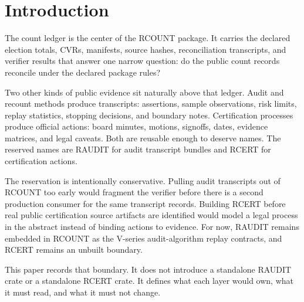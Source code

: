 \section{Introduction}

The count ledger is the center of the RCOUNT package. It carries the declared
election totals, CVRs, manifests, source hashes, reconciliation transcripts, and
verifier results that answer one narrow question: do the public count records
reconcile under the declared package rules?

Two other kinds of public evidence sit naturally above that ledger. Audit and
recount methods produce transcripts: assertions, sample observations, risk
limits, replay statistics, stopping decisions, and boundary notes. Certification
processes produce official actions: board minutes, motions, signoffs, dates,
evidence matrices, and legal caveats. Both are reusable enough to deserve names.
The reserved names are RAUDIT for audit transcript bundles and RCERT for
certification actions.

The reservation is intentionally conservative. Pulling audit transcripts out of
RCOUNT too early would fragment the verifier before there is a second production
consumer for the same transcript records. Building RCERT before real public
certification source artifacts are identified would model a legal process in the
abstract instead of binding actions to evidence. For now, RAUDIT remains embedded
in RCOUNT as the V-series audit-algorithm replay contracts, and RCERT remains an
unbuilt boundary.

This paper records that boundary. It does not introduce a standalone RAUDIT
crate or a standalone RCERT crate. It defines what each layer would own, what it
must read, and what it must not change.
